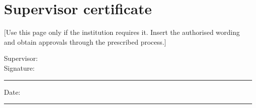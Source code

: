 \chapter*{Supervisor certificate}

[Use this page only if the institution requires it. Insert the authorised
wording and obtain approvals through the prescribed process.]

\vspace{18mm}
\noindent Supervisor: \Supervisor\\[10mm]
Signature: \rule{55mm}{0.4pt}\hfill Date: \rule{35mm}{0.4pt}
